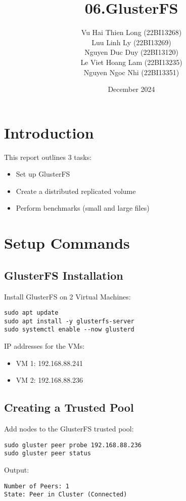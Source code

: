\documentclass[a4paper,12pt]{article}
\begin{document}
\title{06.GlusterFS}
\author{
    Vu Hai Thien Long (22BI13268) \\
    Luu Linh Ly (22BI13269) \\
    Nguyen Duc Duy (22BI13120) \\
    Le Viet Hoang Lam (22BI13235) \\
    Nguyen Ngoc Nhi (22BI13351)
}
\date{December 2024}
\maketitle

\section{Introduction}
This report outlines 3 tasks:
\begin{itemize}
    \item Set up GlusterFS
    \item Create a distributed replicated volume
    \item Perform benchmarks (small and large files)
\end{itemize}

\section{Setup Commands}

\subsection{GlusterFS Installation}
Install GlusterFS on 2 Virtual Machines:
\begin{lstlisting}
sudo apt update
sudo apt install -y glusterfs-server
sudo systemctl enable --now glusterd
\end{lstlisting}
IP addresses for the VMs:
\begin{itemize}
    \item VM 1: 192.168.88.241
    \item VM 2: 192.168.88.236
\end{itemize}

\subsection{Creating a Trusted Pool}
Add nodes to the GlusterFS trusted pool:
\begin{lstlisting}
sudo gluster peer probe 192.168.88.236
sudo gluster peer status
\end{lstlisting}
Output:
\begin{lstlisting}
Number of Peers: 1
State: Peer in Cluster (Connected)
\end{lstlisting}
\end{document}
